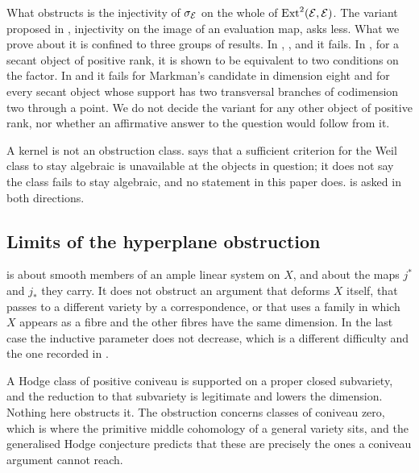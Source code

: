 \begin{remark}\label{rem:weakerscope}
What  obstructs is the injectivity of $\sigma_{\mathcal{E}}$ on the
whole of $\operatorname{Ext}^{2}(\mathcal{E},\mathcal{E})$. The variant proposed in
\cite[Question 11.4]{Mar25b}, injectivity on the image of an evaluation map,
asks less. What we prove about it is confined to three groups of results.
In , ,  and
 it fails. In , for a secant object of
positive rank, it is shown to be equivalent to two conditions on the factor.
In  and  it fails for
Markman's candidate in dimension eight and for every secant object whose
support has two transversal branches of codimension two through a point. We
do not decide the variant for any other object of positive rank, nor whether
an affirmative answer to the question would follow from it.
\end{remark}

\begin{remark}\label{rem:notnondeform}
A kernel is not an obstruction class.  says that a sufficient
criterion for the Weil class to stay algebraic is unavailable at the objects
in question; it does not say the class fails to stay algebraic, and no
statement in this paper does.  is asked in both
directions.
\end{remark}

\subsection{Limits of the hyperplane obstruction}

\begin{remark}%
\label{rem:notlinear}
 is about smooth members of an ample linear system on
$X$, and about the maps $j^{*}$ and $j_{*}$ they carry. It does not obstruct
an argument that deforms $X$ itself, that passes to a different variety by a
correspondence, or that uses a family in which $X$ appears as a fibre and the
other fibres have the same dimension. In the last case the inductive parameter
does not decrease, which is a different difficulty and the one recorded in
.
\end{remark}

\begin{remark}[Coniveau]\label{rem:coniveauscope}
A Hodge class of positive coniveau is supported on a proper closed
subvariety, and the reduction to that subvariety is legitimate and lowers the
dimension. Nothing here obstructs it. The obstruction concerns classes of
coniveau zero, which is where the primitive middle cohomology of a general
variety sits, and the generalised Hodge conjecture predicts that these are
precisely the ones a coniveau argument cannot reach.
\end{remark}

